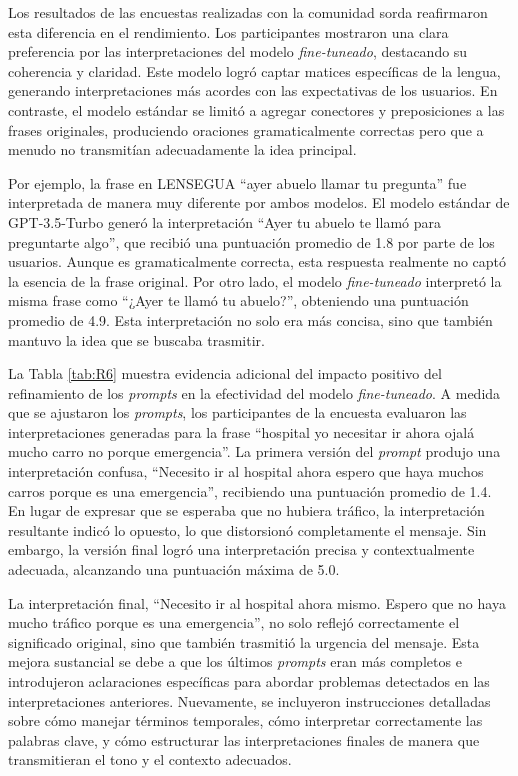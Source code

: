 Los resultados de las encuestas realizadas con la comunidad sorda reafirmaron esta diferencia en el rendimiento. Los participantes mostraron una clara preferencia por las interpretaciones del modelo \textit{fine-tuneado}, destacando su coherencia y claridad. Este modelo logró captar matices específicas de la lengua, generando interpretaciones más acordes con las expectativas de los usuarios. En contraste, el modelo estándar se limitó a agregar conectores y preposiciones a las frases originales, produciendo oraciones gramaticalmente correctas pero que a menudo no transmitían adecuadamente la idea principal.

Por ejemplo, la frase en LENSEGUA “ayer abuelo llamar tu pregunta” fue interpretada de manera muy diferente por ambos modelos. El modelo estándar de GPT-3.5-Turbo generó la interpretación “Ayer tu abuelo te llamó para preguntarte algo”, que recibió una puntuación promedio de 1.8 por parte de los usuarios. Aunque es gramaticalmente correcta, esta respuesta realmente no captó la esencia de la frase original. Por otro lado, el modelo \textit{fine-tuneado} interpretó la misma frase como “¿Ayer te llamó tu abuelo?”, obteniendo una puntuación promedio de 4.9. Esta interpretación no solo era más concisa, sino que también mantuvo la idea que se buscaba trasmitir.  

La Tabla \ref{tab:R6} muestra evidencia adicional del impacto positivo del refinamiento de los \textit{prompts} en la efectividad del modelo \textit{fine-tuneado}. A medida que se ajustaron los \textit{prompts}, los participantes de la encuesta evaluaron las interpretaciones generadas para la frase “hospital yo necesitar ir ahora ojalá mucho carro no porque emergencia”. La primera versión del \textit{prompt} produjo una interpretación confusa, “Necesito ir al hospital ahora espero que haya muchos carros porque es una emergencia”, recibiendo una puntuación promedio de 1.4. En lugar de expresar que se esperaba que no hubiera tráfico, la interpretación resultante indicó lo opuesto, lo que distorsionó completamente el mensaje. Sin embargo, la versión final logró una interpretación precisa y contextualmente adecuada, alcanzando una puntuación máxima de 5.0.

La interpretación final, “Necesito ir al hospital ahora mismo. Espero que no haya mucho tráfico porque es una emergencia”, no solo reflejó correctamente el significado original, sino que también trasmitió la urgencia del mensaje. Esta mejora sustancial se debe a que los últimos \textit{prompts} eran más completos e introdujeron aclaraciones específicas para abordar problemas detectados en las interpretaciones anteriores. Nuevamente, se incluyeron instrucciones detalladas sobre cómo manejar términos temporales, cómo interpretar correctamente las palabras clave, y cómo estructurar las interpretaciones finales de manera que transmitieran el tono y el contexto adecuados.

